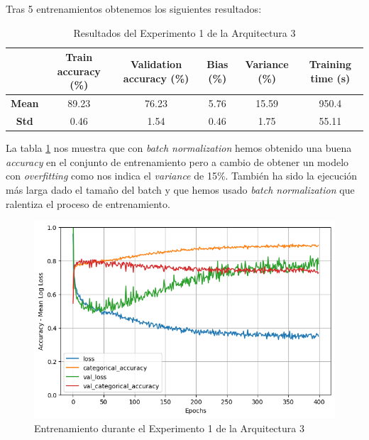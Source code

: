 \documentclass{article}
\begin{document}
			Tras 5 entrenamientos obtenemos los siguientes resultados:
			
			\begin{table}[!h]
				\begin{center}
					\begin{tabular}{ c | c | c | c | c | c |}
						\ & \textbf{Train accuracy (\%)} & \textbf{Validation accuracy (\%)} & \textbf{Bias (\%)} & \textbf{Variance (\%)} & \textbf{Training time (s)} \\ \hline
						\textbf{Mean} & 89.23 & 76.23 & 5.76 & 15.59 & 950.4 \\ \hline
						\textbf{Std} & 0.46 & 1.54 & 0.46 & 1.75 & 55.11 \\ \hline
					\end{tabular}
					\caption{Resultados del Experimento 1 de la Arquitectura 3}
					\label{tab:res-d-a3-e1}
				\end{center}
			\end{table}
			La tabla \ref{tab:res-d-a3-e1} nos muestra que con \textit{batch normalization} hemos obtenido una buena \textit{accuracy} en el conjunto de entrenamiento pero a cambio de obtener un modelo con \textit{overfitting} como nos indica el \textit{variance} de 15\%. Tambi\'en ha sido la ejecuci\'on m\'as larga dado el tama\~no del batch y que hemos usado \textit{batch normalization} que ralentiza el proceso de entrenamiento.
			\newpage
			 
			\begin{figure}[!h]
				\begin{center}
					\includegraphics[scale=0.5]{d-tr-a3-e1.png}		
					\caption{Entrenamiento durante el Experimento 1 de la Arquitectura 3}	
					\label{d-tr-a3-e1}
				\end{center}
			\end{figure}
			
\end{document}
